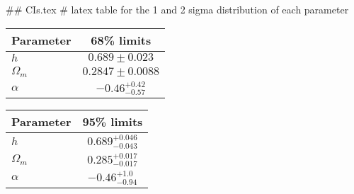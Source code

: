 ## CIs.tex
# latex table for the 1 and 2 sigma distribution of each parameter

\begin{tabular} { l  c}
 Parameter &  68\% limits\\
\hline
{\boldmath$h              $} & $0.689\pm 0.023            $\\
{\boldmath$\Omega_m       $} & $0.2847\pm 0.0088          $\\
{\boldmath$\alpha         $} & $-0.46^{+0.42}_{-0.57}     $\\
\hline
\end{tabular}

\begin{tabular} { l  c}
 Parameter &  95\% limits\\
\hline
{\boldmath$h              $} & $0.689^{+0.046}_{-0.043}   $\\
{\boldmath$\Omega_m       $} & $0.285^{+0.017}_{-0.017}   $\\
{\boldmath$\alpha         $} & $-0.46^{+1.0}_{-0.94}      $\\
\hline
\end{tabular}
